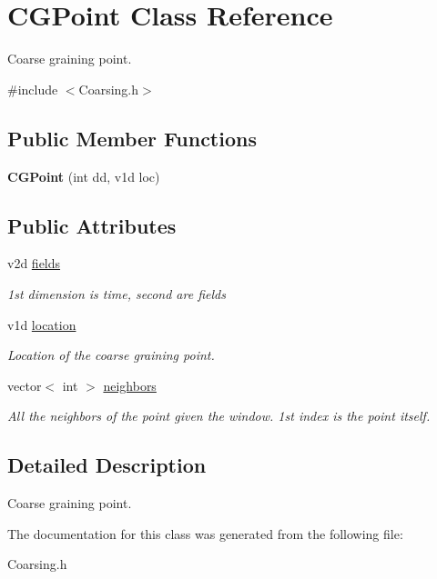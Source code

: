 \hypertarget{classCGPoint}{}\section{C\+G\+Point Class Reference}
\label{classCGPoint}


Coarse graining point.  




{\ttfamily \#include $<$Coarsing.\+h$>$}

\subsection*{Public Member Functions}
\begin{DoxyCompactItemize}
\item 
\mbox{\label{classCGPoint_a85026786569ae92db296a062327322bc}} 
{\bfseries C\+G\+Point} (int dd, v1d loc)
\end{DoxyCompactItemize}
\subsection*{Public Attributes}
\begin{DoxyCompactItemize}
\item 
\mbox{\label{classCGPoint_ad0fd06c53bc917bdf91abbbdb4b8e4c3}} 
v2d \hyperlink{classCGPoint_ad0fd06c53bc917bdf91abbbdb4b8e4c3}{fields}
\begin{DoxyCompactList}\small\item\em 1st dimension is time, second are fields \end{DoxyCompactList}\item 
\mbox{\label{classCGPoint_a8b3032ef9cfc6f32d1cab9aa912ce82d}} 
v1d \hyperlink{classCGPoint_a8b3032ef9cfc6f32d1cab9aa912ce82d}{location}
\begin{DoxyCompactList}\small\item\em Location of the coarse graining point. \end{DoxyCompactList}\item 
\mbox{\label{classCGPoint_a50e3237ed6a858bd62b8196f0cff2332}} 
vector$<$ int $>$ \hyperlink{classCGPoint_a50e3237ed6a858bd62b8196f0cff2332}{neighbors}
\begin{DoxyCompactList}\small\item\em All the neighbors of the point given the window. 1st index is the point itself. \end{DoxyCompactList}\end{DoxyCompactItemize}


\subsection{Detailed Description}
Coarse graining point. 

The documentation for this class was generated from the following file\+:\begin{DoxyCompactItemize}
\item 
Coarsing.\+h\end{DoxyCompactItemize}
